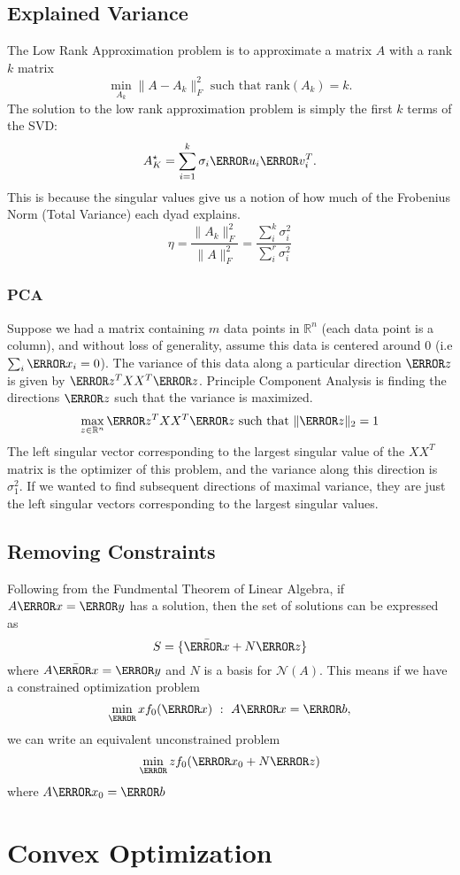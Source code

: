 \subsection{Explained Variance}
The Low Rank Approximation problem is to approximate a matrix $A$ with a rank $k$ matrix
\[
	\min_{A_k} \|A - A_k\|_F^2 \text{ such that rank}(A_k) = k.
\]
The solution to the low rank approximation problem is simply the first $k$ terms of the SVD:
\[
	A_K^\star = \sum_{i=1}^k \sigma_i\V{u}_i\V{v}^T_i.
\]
This is because the singular values give us a notion of how much of the Frobenius Norm (Total Variance) each dyad explains.
\[
	\eta = \frac{\|A_k\|_F^2}{\|A\|_F^2} = \frac{\sum_i^k \sigma_i^2}{\sum_i^r \sigma_i^2}
\]
\subsubsection{PCA}
Suppose we had a matrix containing $m$ data points in $\mathbb{R}^n$ (each data point is a column), and without loss of generality, assume this data is centered around 0 (i.e $\sum_i \V{x}_i = 0$).
The variance of this data along a particular direction $\V{z}$ is given by $\V{z}^TXX^T\V{z}$.
Principle Component Analysis is finding the directions $\V{z}$ such that the variance is maximized.
\[
	\max_{z\in\mathbb{R}^n} \V{z}^TXX^T\V{z} \text{ such that } \|\V{z}\|_2 = 1
\]
The left singular vector corresponding to the largest singular value of the $XX^T$ matrix is the optimizer of this problem, and the variance along this direction is $\sigma_1^2$.
If we wanted to find subsequent directions of maximal variance, they are just the left singular vectors corresponding to the largest singular values.
\subsection{Removing Constraints}
Following from the Fundmental Theorem of Linear Algebra, if $A\V{x}=\V{y}$ has a solution, then the set of solutions can be expressed as
\[
	S = \{\bar{\V{x}} + N\V{z}\}
\]
where $A\bar{\V{x}}=\V{y}$ and $N$ is a basis for $\mathcal{N}(A)$.
This means if we have a constrained optimization problem
\[
	\min_\V{x} f_0(\V{x}) \ : \ A\V{x} = \V{b},
\]
we can write an equivalent unconstrained problem \[
	\min_\V{z} f_0(\V{x}_0 + N\V{z})
\]
where $A\V{x}_0 = \V{b}$
\section{Convex Optimization}
